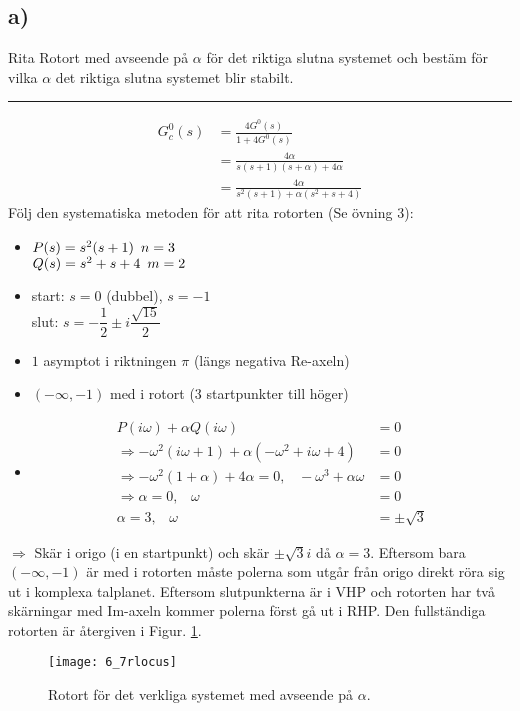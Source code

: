 \documentclass[12pt]{article}
\newcommand{\qline}{\hrule \vspace*{10pt}}
\begin{document}
\subsection*{a)}
Rita Rotort med avseende på $\alpha$ för det riktiga slutna systemet och bestäm för vilka $\alpha$ det riktiga slutna systemet blir stabilt.
\qline
\begin{align*}
  G_c^0(s) &= \frac{4G^0(s)}{1 + 4G^0(s)} \\
  &= \frac{4\alpha}{s(s+1)(s+\alpha) + 4\alpha} \\
  &= \frac{4\alpha}{s^2(s+1) + \alpha(s^2+s+4)}
\end{align*}
Följ den systematiska metoden för att rita rotorten (Se övning 3):
\begin{itemize}
\item
  $P(s) = s^2(s+1) \hspace*{5pt} n = 3$ \\
  $Q(s) = s^2+s+4 \hspace*{5pt} m = 2$
\item start: $s = 0$ (dubbel), $s = -1$ \\
  slut: $s = -\dfrac{1}{2} \pm i \dfrac{\sqrt{15}}{2}$
\item $1$ asymptot i riktningen $\pi$ (längs negativa Re-axeln)
\item $(-\infty,-1)$ med i rotort ($3$ startpunkter till höger)
\item
  \begin{align*}
    P(i\omega) + \alpha Q(i\omega) &= 0 \\
    \Rightarrow -\omega^2(i\omega+1) + \alpha (-\omega^2+i\omega+4) &= 0 \\
    \Rightarrow -\omega^2(1+\alpha) + 4\alpha = 0,\;\;\; -\omega^3+\alpha\omega &= 0 \\
    \Rightarrow \alpha = 0, \;\;\; \omega &= 0 \\
    \alpha = 3,\;\;\; \omega &= \pm \sqrt{3}
  \end{align*}
\end{itemize}
$\Rightarrow$ Skär i origo (i en startpunkt) och skär $\pm \sqrt{3}i$ då $\alpha = 3$. Eftersom bara $(-\infty,-1)$ är med i rotorten måste polerna som utgår från origo direkt röra sig ut i komplexa talplanet. Eftersom slutpunkterna är i VHP och rotorten har två skärningar med Im-axeln kommer polerna först gå ut i RHP. Den fullständiga rotorten är återgiven i Figur. \ref{fig:67rlocus}.

\begin{figure}[h!]
  \centering
  \texttt{[image: 6\_7rlocus]}
  \caption{Rotort för det verkliga systemet med avseende på $\alpha$.}
  \label{fig:67rlocus}
\end{figure}
\FloatBarrier
\end{document}
